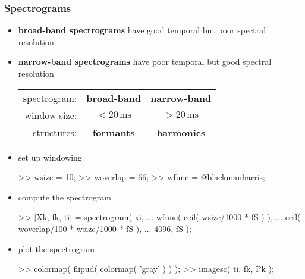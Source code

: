 \begin{frame}[fragile] %
	\frametitle{Spectrograms}
	\begin{itemize}
		\item \textbf{broad-band spectrograms} have good temporal but poor spectral resolution
		\item \textbf{narrow-band spectrograms} have poor temporal but good spectral resolution
			\begin{table}
				\hspace{-2em}
				\small
				\begin{tabular}{rcc}
					spectrogram:&\textbf{broad-band}&\textbf{narrow-band}\\
					window size:&$<\!20\,\textrm{ms}$&$>\!20\,\textrm{ms}$\\
					structures:&\textbf{formants}&\textbf{harmonics}
				\end{tabular}
			\end{table}
		\item set up windowing
			\begin{code}
>> wsize = 10; \color{medium}%
>> woverlap = 66; \color{medium}%
>> wfunc = @blackmanharris; \color{medium}%
			\end{code}
		\item compute the spectrogram
			\begin{code}
>> [Xk, fk, ti] = spectrogram( xi, ... \color{medium}%
	wfunc( ceil( wsize/1000 * fS ) ), ... \color{medium}%
	ceil( woverlap/100 * wsize/1000 * fS ), ... \color{medium}%
	4096, fS ); %
			\end{code}
		\item plot the spectrogram
			\begin{code}
>> colormap( flipud( colormap( 'gray' ) ) ); \color{medium} %
>> imagesc( ti, fk, Pk ); \color{medium} %
			\end{code}
	\end{itemize}
\end{frame}
